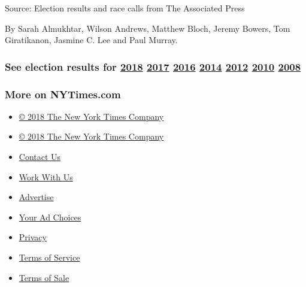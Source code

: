 Source: Election results and race calls from The Associated Press

By Sarah Almukhtar, Wilson Andrews, Matthew Bloch, Jeremy Bowers, Tom
Giratikanon, Jasmine C. Lee and Paul Murray.

\hypertarget{see-election-results-for-2018-2017-2016-2014-2012-2010-2008}{%
\subsubsection{\texorpdfstring{See election results for
\href{https://www.nytimes3xbfgragh.onion/interactive/2018/us/elections/calendar-primary-results.html}{2018}
\href{https://www.nytimes3xbfgragh.onion/interactive/2017/us/elections/election-calendar.html}{2017}
\href{https://www.nytimes3xbfgragh.onion/elections/results/president}{2016}
\href{https://www.nytimes3xbfgragh.onion/elections/2014/results/senate}{2014}
\href{https://www.nytimes3xbfgragh.onion/elections/2012/results/president.html}{2012}
\href{https://www.nytimes3xbfgragh.onion/elections/2010/results/senate.html}{2010}
\href{https://www.nytimes3xbfgragh.onion/elections/2008/results/president/map.html}{2008}}{See election results for 2018 2017 2016 2014 2012 2010 2008}}\label{see-election-results-for-2018-2017-2016-2014-2012-2010-2008}}

\hypertarget{more-on-nytimescom}{%
\subsubsection{More on NYTimes.com}\label{more-on-nytimescom}}

\begin{itemize}
\tightlist
\item
  \href{http://www.nytco.com}{© 2018 The New York Times Company}
\end{itemize}

\begin{itemize}
\tightlist
\item
  \href{http://www.nytco.com}{© 2018 The New York Times Company}
\item
  \href{http://www.nytimes3xbfgragh.onion/ref/membercenter/help/infoservdirectory.html}{Contact
  Us}
\item
  \href{http://www.nytco.com/careers}{Work With Us}
\item
  \href{http://www.nytimes.whsites.net/mediakit}{Advertise}
\item
  \href{http://www.nytimes3xbfgragh.onion/content/help/rights/privacy/policy/privacy-policy.html\#pp}{Your
  Ad Choices}
\item
  \href{http://www.nytimes3xbfgragh.onion/privacy}{Privacy}
\item
  \href{http://www.nytimes3xbfgragh.onion/ref/membercenter/help/agree.html}{Terms
  of Service}
\item
  \href{http://www.nytimes3xbfgragh.onion/content/help/rights/sale/terms-of-sale.html}{Terms
  of Sale}
\end{itemize}

